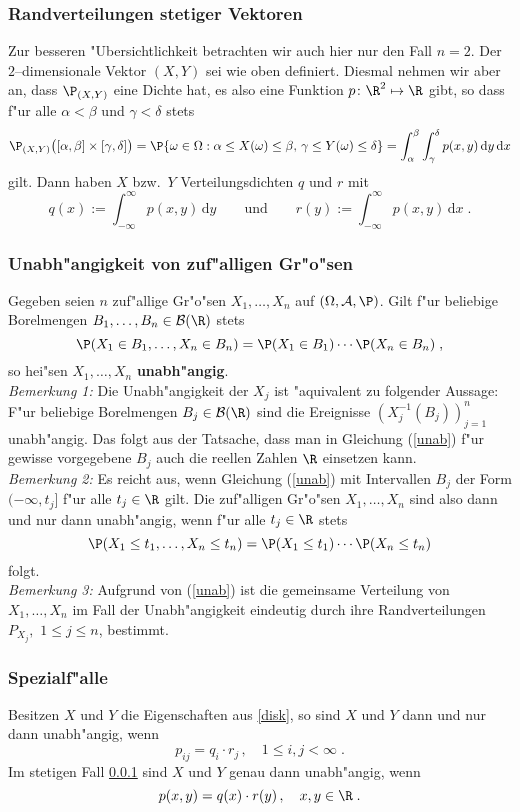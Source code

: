 \subsubsection{Randverteilungen stetiger Vektoren}
\label{stet}
Zur besseren "Ubersichtlichkeit betrachten wir auch hier nur den Fall $n=2$. Der
$2$--dimensionale Vektor $(X,Y)$ sei wie oben definiert. Diesmal nehmen wir aber an, dass
$\P_{(X,Y)}$ eine Dichte hat, es also eine Funktion $p \colon\R^2\mapsto\R$ gibt, so
dass f"ur alle $\alpha<\beta$ und $\gamma<\delta$ stets
$$
\P_{(X,Y)}\big([\alpha,\beta]\times[\gamma,\delta]\big)
=\P\{\omega\in \Omega : \alpha\le X(\omega)\le\beta,\,\gamma\le Y(\omega)\le\delta\}
=\int_\alpha^\beta\int_\gamma^\delta p(x,y)\,\mathrm d y \,\mathrm d x
$$
gilt. Dann haben $X$ bzw.~$Y$ Verteilungsdichten $q$ und $r$ mit
$$
q(x):=\int_{-\infty}^\infty p(x,y)\,\mathrm d y\qquad\mbox{und}\qquad
r(y):=\int_{-\infty}^\infty p(x,y)\,\mathrm d x\;.
$$
\subsubsection{Unabh"angigkeit von zuf"alligen Gr"o"sen}
Gegeben seien $n$ zuf"allige Gr"o"sen $X_1,\ldots,X_n$ auf $(\Omega,\fr A,\P)$. Gilt f"ur beliebige
Borelmengen $B_1,\ldots,B_n\in\fr B(\R)$ stets
\begin{equation}
\label{unab}
\P(X_1\in B_1,\ldots,X_n\in B_n)=\P(X_1\in B_1)\cdots\P(X_n\in B_n)\;,
\end{equation}
so hei"sen $X_1,\ldots,X_n$ \textbf{unabh"angig}.\\
\textit{Bemerkung 1:} Die Unabh"angigkeit der $X_j$ ist "aquivalent zu folgender Aussage$\colon$ F"ur
beliebige Borelmengen $B_j\in\fr B(\R)$ sind die Ereignisse $\left(X_j^{-1}(B_j)\right)_{j=1}^n$
unabh"angig. Das folgt aus der Tatsache, dass man in Gleichung (\ref{unab}) f"ur gewisse vorgegebene $B_j$ auch die
reellen Zahlen $\R$ einsetzen kann.\\
\textit{Bemerkung 2:} Es reicht aus, wenn Gleichung (\ref{unab}) mit Intervallen $B_j$ der Form
$(-\infty,t_j]$ f"ur alle $t_j\in\R$ gilt. Die zuf"alligen Gr"o"sen $X_1,\ldots,X_n$ sind also
dann und nur dann unabh"angig, wenn f"ur alle $t_j\in\R$ stets
$$
\P(X_1\le t_1,\ldots,X_n\le t_n)=\P(X_1\le t_1)\cdots\P(X_n\le t_n)
$$
folgt.\\
\textit{Bemerkung 3:} Aufgrund von (\ref{unab}) ist die gemeinsame Verteilung von $X_1,\ldots,X_n$
im Fall der Unabh"angigkeit eindeutig durch
ihre Randverteilungen $P_{X_j},$ $1\le j\le n$, bestimmt.
\subsubsection{Spezialf"alle}
Besitzen $X$ und $Y$ die Eigenschaften aus \ref{disk}, so sind $X$ und $Y$ dann und nur  dann
unabh"angig, wenn
$$
p_{ij}=q_i\cdot r_j\,,\quad 1\le i,j<\infty\;.
$$
Im stetigen Fall \ref{stet} sind $X$ und $Y$ genau dann unabh"angig, wenn
$$
p(x,y)=q(x)\cdot r(y)\,,\quad x,y\in\R\;.
$$

